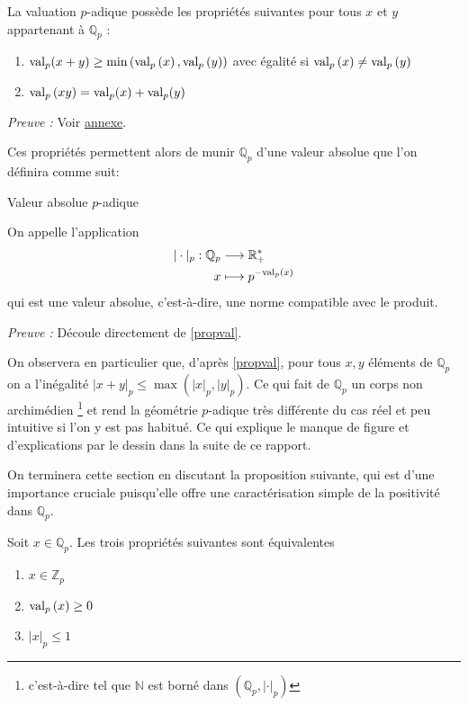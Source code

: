 \begin{propriete}
	La valuation $p$-adique possède les propriétés suivantes pour tous $x$ et $y$ appartenant à $\mathbb{Q}_{p} $ :
	\begin{enumerate}
		\label{propval}
		\item $\text{val}_p(x+y) \ge \min\left( \text{val}_p\left( x \right), \text{val}_p\left( y \right)  \right) $ avec égalité si $\text{val}_p\left(x\right) \neq \text{val}_p\left(y\right)$
		\item $\text{val}_p\left( xy \right) = \text{val}_p (x) + \text{val}_p( y)$ 
	\end{enumerate}
\end{propriete}
\textit{Preuve :} Voir \hyperlink{propvalpreuve}{annexe}.   

Ces propriétés permettent alors de munir $\mathbb{Q}_{p} $ d'une valeur absolue que l'on définira comme suit:

\begin{definition} Valeur absolue $p$-adique
\label{vabs}

On appelle  l'application 
\begin{align*}
|\cdot|_p : \mathbb{Q}_{p} & \longrightarrow \mathbb{R}^*_+\\
x & \longmapsto p^{-\text{val}_p\left(x\right)} 
\end{align*}
qui est une valeur absolue, c'est-à-dire, une norme compatible avec le produit.
\end{definition}

\textit{Preuve :} Découle directement de \ref{propval}.

On observera en particulier que, d'après \ref{propval}, pour tous $x,y$ éléments de $\mathbb{Q}_{p}$ on a l'inégalité $\left|x+y\right|_p \le \max\left( \left| x \right|_p,\left| y \right|_p \right)$. Ce qui fait de $\mathbb{Q}_{p} $ un corps non archimédien \footnote{c'est-à-dire tel que $\mathbb{N}$ est borné dans $\left( \mathbb{Q}_{p}, \left| \cdot \right|_p \right) $} et rend la géométrie $p$-adique très différente du cas réel et peu intuitive si l'on y est pas habitué. Ce qui explique le manque de figure et d'explications par le dessin dans la suite de ce rapport.

On terminera cette section en discutant la proposition suivante, qui est d'une importance cruciale puisqu'elle offre une caractérisation simple de la positivité dans $\mathbb{Q}_{p}$.

\begin{proposition}
	Soit $x \in \mathbb{Q}_{p} $. Les trois propriétés suivantes sont équivalentes 
	\begin{enumerate}[label= \textit{\roman*}.]
		\item $x \in \mathbb{Z}_p$
		\item $\text{val}_p\left(x\right)\ge 0$
		\item $\left| x \right|_p\le 1$
	\end{enumerate}
\end{proposition}

